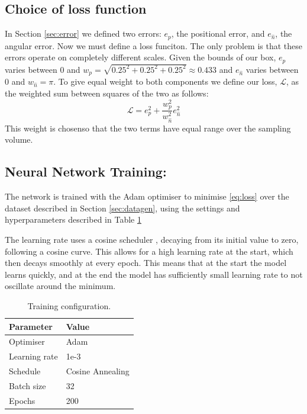 \documentclass[12pt,a4paper]{report}
\begin{document}
\subsection{Choice of loss function}
In Section \ref{sec:error} we defined two errors: $e_p$, the positional error, and $e_{\hat{n}}$, the angular error. Now we must define a loss funciton. The only problem is that these errors operate on completely different scales. Given the bounds of our box, $e_p$ varies between $0$ and $w_p = \sqrt{0.25^2+0.25^2+0.25^2} \approx 0.433$ and $e_{\hat{n}}$ varies between $0$ and $w_{\hat{n}} = \pi$. To give equal weight to both components we define our loss, $\mathcal{L}$, as the weighted sum between squares of the two as follows: 
\begin{equation}
  \mathcal{L} = e_p^2 + \frac{w_p^2}{w_{\hat{n}}^2} e_{\hat{n}}^2
  \label{eq:loss}
\end{equation}
This weight is chosenso that the two terms have equal range over the sampling volume.
\subsection{Neural Network Training:}
The network is trained with the Adam optimiser \cite{kingma2015} to minimise \eqref{eq:loss} over the dataset described in Section \ref{sec:datagen}, using the settings and hyperparameters described in Table \ref{tab:training}

The learning rate uses a cosine scheduler \cite{loshchilov2017}, decaying from its initial value to zero, following a cosine curve. This allows for a high learning rate at the start, which then decays smoothly at every epoch. This means that at the start the model learns quickly, and at the end the model has sufficiently small learning rate to not oscillate around the minimum. 

\begin{table}
  \centering
  \begin{tabular}{ll}
    \toprule
    Parameter & Value \\
    \midrule
    Optimiser       & Adam \\
    Learning rate   & 1e-3 \\
    Schedule        & Cosine Annealing \\
    Batch size      & 32 \\
    Epochs          & 200 \\
    \bottomrule
  \end{tabular}
  \caption{Training configuration.}
  \label{tab:training}
\end{table}
\end{document}
